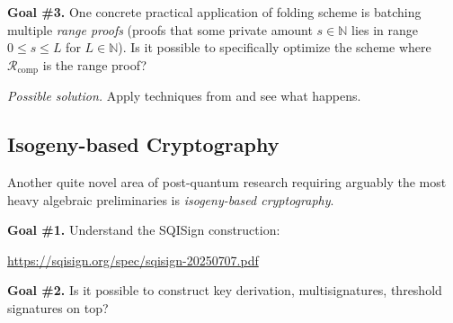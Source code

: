 \documentclass{template}
\begin{document}
\textbf{Goal \#3.} One concrete practical application of folding scheme is
batching multiple \textit{range proofs} (proofs that some private amount $s \in
\mathbb{N}$ lies in range $0 \leq s \leq L$ for $L \in \mathbb{N}$). Is it possible
to specifically optimize the scheme where $\mathcal{R}_{\text{comp}}$ is the range proof?

\textit{Possible solution.} Apply techniques from \cite{cryptoeprint:2020/517} and see what happens.

\subsection*{Isogeny-based Cryptography}

Another quite novel area of post-quantum research requiring
arguably the most heavy algebraic preliminaries is \textit{isogeny-based cryptography}.

\textbf{Goal \#1.} Understand the SQISign construction:

\begin{center}
    \url{https://sqisign.org/spec/sqisign-20250707.pdf}
\end{center}

\textbf{Goal \#2.} Is it possible to construct key derivation, multisignatures, threshold signatures on top?



\end{document}
